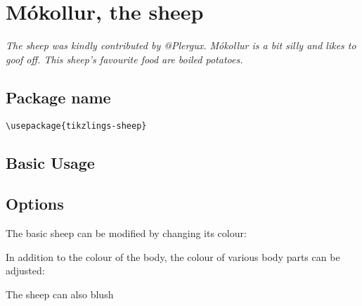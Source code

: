 \documentclass[parskip=half]{scrartcl}
\begin{document}
%
%
\clearpage
\section[Sheep]{Mókollur, the sheep}

\emph{The sheep was kindly contributed by @Plergux. Mókollur is a bit silly and likes to goof off. This sheep's favourite food are boiled potatoes.}

\subsection{Package name}

\begin{tcolorbox}[lower separated=false, lefthand width=.8\linewidth]
\vspace*{0.5cm}
\lstinline|\usepackage{tikzlings-sheep}| 
\vspace*{0.5cm}
\end{tcolorbox}

\subsection{Basic Usage}

\begin{tcblisting}{}
\sheep
\end{tcblisting}

\subsection{Options}

The basic sheep can be modified by changing its colour:
\begin{tcblisting}{}
\sheep[body=blue]
\end{tcblisting}

In addition to the colour of the body, the colour of various body parts can be adjusted:
\begin{tcblisting}{}
\sheep[eye=red]
\end{tcblisting}
\begin{tcblisting}{}
\sheep[nose=red]
\end{tcblisting}

The sheep can also blush
\begin{tcblisting}{}
\sheep[blush=red]
\end{tcblisting}
\end{document}

